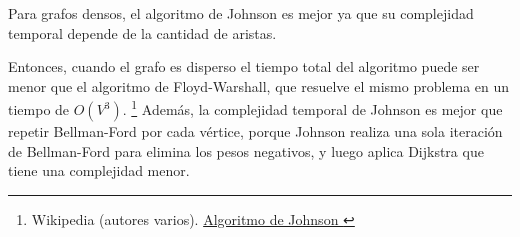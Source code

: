 \documentclass[../tp2_grupo404.tex]{subfiles}
\begin{document}
Para grafos densos, el algoritmo de Johnson es mejor ya que su complejidad
temporal depende de la cantidad de aristas.

Entonces, cuando el grafo es disperso el tiempo total del algoritmo
puede ser menor que el algoritmo de Floyd-Warshall, que resuelve el
mismo problema en un tiempo de $O(V^3)$.
\footnote{Wikipedia (autores varios).
\href{https://es.wikipedia.org/wiki/Algoritmo_de_Johnson}{\guillemotleft Algoritmo de Johnson \guillemotright}}
Además, la complejidad temporal de Johnson es mejor que
repetir Bellman-Ford por cada vértice, porque Johnson realiza una sola
iteración de Bellman-Ford para elimina los pesos negativos,
y luego aplica Dijkstra que tiene una complejidad menor.

\end{document}
